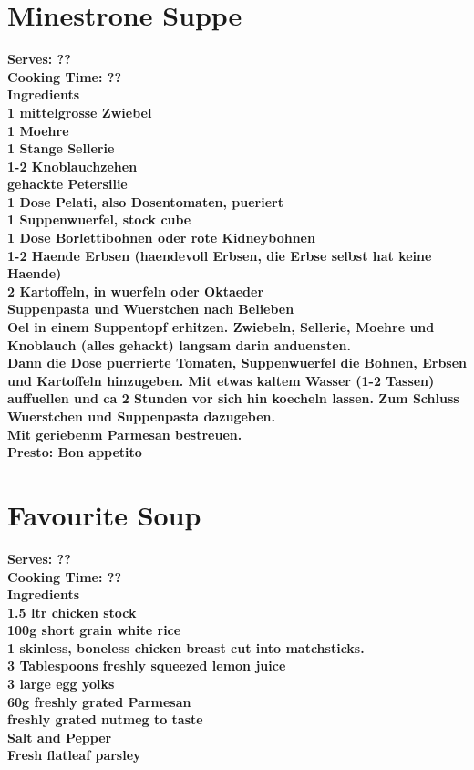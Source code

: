 \documentclass[18pt, oneside]{book}
\begin{document}
\section{Minestrone Suppe}
\bf{Serves: ??} \\
\bf{Cooking Time: ??} \\

\bf{Ingredients} \normalfont \\
1 mittelgrosse Zwiebel \\
1 Moehre \\
1 Stange Sellerie        \\
1-2 Knoblauchzehen \\
gehackte Petersilie \\
1 Dose Pelati, also Dosentomaten, pueriert \\
1 Suppenwuerfel, stock cube  \\
1 Dose Borlettibohnen oder rote Kidneybohnen \\
1-2 Haende Erbsen (haendevoll Erbsen, die Erbse selbst hat keine Haende) \\
2 Kartoffeln, in wuerfeln oder Oktaeder \\
Suppenpasta und Wuerstchen nach Belieben \\


Oel in einem Suppentopf erhitzen. Zwiebeln, Sellerie, Moehre und Knoblauch (alles gehackt) langsam darin anduensten.\\ 

Dann die Dose puerrierte Tomaten, Suppenwuerfel die Bohnen, Erbsen und Kartoffeln hinzugeben. Mit etwas kaltem Wasser (1-2 Tassen) auffuellen und ca 2 Stunden vor sich hin koecheln lassen. Zum Schluss Wuerstchen und Suppenpasta dazugeben. \\

Mit geriebenm Parmesan bestreuen. \\

Presto: Bon appetito

\section{ Favourite Soup}

\bf{Serves: ??} \\
\bf{Cooking Time: ??} \\ 

\bf{Ingredients} \normalfont \\ 
1.5 ltr chicken stock \\
100g short grain white rice \\
1 skinless, boneless chicken breast cut into matchsticks.\\
3 Tablespoons freshly squeezed lemon juice \\
3 large egg yolks \\
60g freshly grated Parmesan \\
freshly grated nutmeg to taste \\
Salt and Pepper \\
Fresh flatleaf parsley \\
 
\end{document}
